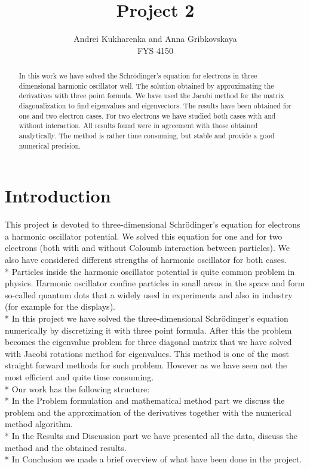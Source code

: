 \documentclass[10pt]{article}
\begin{document}
\setlength\parindent{1pt}
\title{Project 2}
\author{Andrei Kukharenka and Anna Gribkovskaya \\  
FYS 4150 
}

\maketitle
\begin{abstract}
In this work we have solved the Schr\"{o}dinger's equation for electrons in three dimensional harmonic oscillator well. The solution obtained by approximating the derivatives with three point formula. We have used the Jacobi method for the matrix diagonalization to find eigenvalues and eigenvectors. The results have been obtained for one and two electron cases. For two electrons we have studied both cases with and without interaction. All results found were in agreement with those obtained analytically. The method is rather time consuming, but stable and provide a good numerical precision. 
\end{abstract}
\clearpage 


\section{Introduction}
This project is devoted to three-dimensional Schr\"{o}dinger's equation for electrons a harmonic oscillator potential. We solved this equation for one and for two electrons (both with and without Coloumb interaction between particles). We also have considered different strengths of harmonic oscillator for both cases. \\*
Particles inside the harmonic oscillator potential is quite common problem in physics. Harmonic oscillator confine particles in small areas in the space and form so-called quantum dots that a widely used in experiments and also in industry (for example for the displays). \\*
In this project we have solved the three-dimensional Schr\"{o}dinger's equation numerically by discretizing it with three point formula. After this the problem becomes the eigenvalue problem for three diagonal matrix that we have solved with Jacobi rotations method for eigenvalues. This method is one of the most straight forward methods for such problem. However as we have seen not the most efficient and quite time consuming. \\*
Our work has the following structure:\\*
In the Problem formulation and mathematical method \label{Part1} part we discuss the problem and the approximation of the derivatives together with the numerical method algorithm. \\*
In the Results and Discussion part we   have presented all the data, discuss the method and the obtained results. \\*
In Conclusion we made a brief overview of what have been done in the project. 
\end{document}
